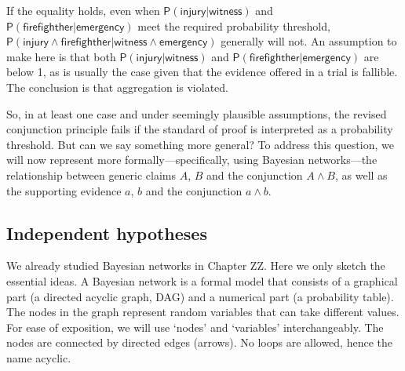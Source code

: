\documentclass[
  10pt,
  dvipsnames,enabledeprecatedfontcommands]{scrartcl}
\newcommand{\pr}[1]{\ensuremath{\mathsf{P}(#1)}}
\begin{document}
\noindent If the equality holds, even when
\(\pr{\textsf{injury} \vert \textsf{witness}}\) and
\(\pr{\textsf{firefighther} \vert \textsf{emergency} }\) meet the
required probability threshold,
\(\pr{\textsf{injury} \wedge \textsf{firefighther} \vert \textsf{witness} \wedge \textsf{emergency}}\)
generally will not. An assumption to make here is that both
\(\pr{\textsf{injury} \vert \textsf{witness}}\) and
\(\pr{\textsf{firefighther} \vert \textsf{emergency} }\) are below 1, as
is usually the case given that the evidence offered in a trial is
fallible. The conclusion is that aggregation is violated.

So, in at least one case and under seemingly plausible assumptions, the
revised conjunction principle fails if the standard of proof is
interpreted as a probability threshold. But can we say something more
general? To address this question, we will now represent more
formally---specifically, using Bayesian networks---the relationship
between generic claims \(A\), \(B\) and the conjunction \(A\wedge B\),
as well as the supporting evidence \(a\), \(b\) and the conjunction
\(a\wedge b\).

\hypertarget{independent-hypotheses}{%
\subsection{Independent hypotheses}\label{independent-hypotheses}}

We already studied Bayesian networks in Chapter ZZ.
 Here we only sketch the essential ideas. A
Bayesian network is a formal model that consists of a graphical part (a
directed acyclic graph, \textsf{DAG}) and a numerical part (a
probability table). The nodes in the graph represent random variables
that can take different values. For ease of exposition, we will use
`nodes' and `variables' interchangeably. The nodes are connected by
directed edges (arrows). No loops are allowed, hence the name acyclic.
\end{document}
